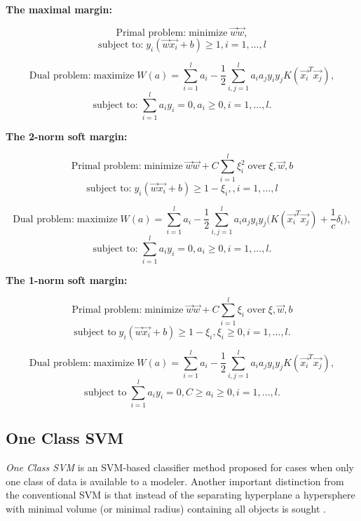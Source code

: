 \textbf{The maximal margin:}

\[\textrm{Primal problem:}\; \textrm{minimize}\; \vec{w} \vec{w},\] \[\textrm{subject to:}\; y_i(\vec{w}\vec{x_i} + b) \geq 1, i = 1, ...,l \] 

\[\textrm{Dual problem:}\; \textrm{maximize}\; W(a) =  \sum_{i=1}^{l} a_i - \frac{1}{2}\sum_{i,j = 1}^{l}a_i a_j y_i y_j K(\vec{x_i}^T \vec{x_j}), \] 
\[\textrm{subject to:}\; \sum_{i=1}^{l}a_i y_i = 0, a_i \geq 0, i = 1,...,l.\] 

\textbf{The 2-norm soft margin:}

\[\textrm{Primal problem:}\; \textrm{minimize}\; \vec{w} \vec{w} + C \sum_{i=1}^{l} \xi^2_i\; \textrm{over}\; \xi,\vec{w},b\] 
\[\textrm{subject to:}\; y_i(\vec{w}\vec{x_i} + b) \geq 1 - \xi_i,, i = 1, ...,l \] 

\[\textrm{Dual problem:}\; \textrm{maximize}\; W(a) =  \sum_{i=1}^{l} a_i - \frac{1}{2}\sum_{i,j = 1}^{l}a_i a_j y_i y_j \Big( K(\vec{x_i}^T \vec{x_j}) + \frac{1}{c}\delta_i \Big), \] 
\[\textrm{subject to:}\; \sum_{i=1}^{l}a_i y_i = 0, a_i \geq 0, i = 1,...,l.\] 

\textbf{The 1-norm soft margin:}

\[\textrm{Primal problem:}\; \textrm{minimize}\; \vec{w} \vec{w} + C \sum_{i=1}^{l} \xi_i\; \textrm{over}\; \xi,\vec{w},b\] 
\[\textrm{subject to}\; y_i(\vec{w}\vec{x_i} + b) \geq 1 - \xi_i,\xi_i \geq 0, i = 1, ...,l.\] 

\[\textrm{Dual problem:}\; \textrm{maximize}\; W(a) =  \sum_{i=1}^{l} a_i - \frac{1}{2}\sum_{i,j = 1}^{l}a_i a_j y_i y_j K(\vec{x_i}^T \vec{x_j}) , \]
\[\textrm{subject to}\; \sum_{i=1}^{l}a_i y_i = 0,C \geq a_i \geq 0, i = 1,...,l.\] 

\subsection{One Class SVM}\label{Chapter:OC-SVM}
\textit{One Class SVM} is an SVM-based classifier method proposed for cases when only one class of data is available to a modeler. Another important distinction from the conventional SVM is that instead of the separating hyperplane a hypersphere with minimal volume (or
minimal radius) containing all objects is sought \cite{Tax:2004:SVD:960091.960109}. 

